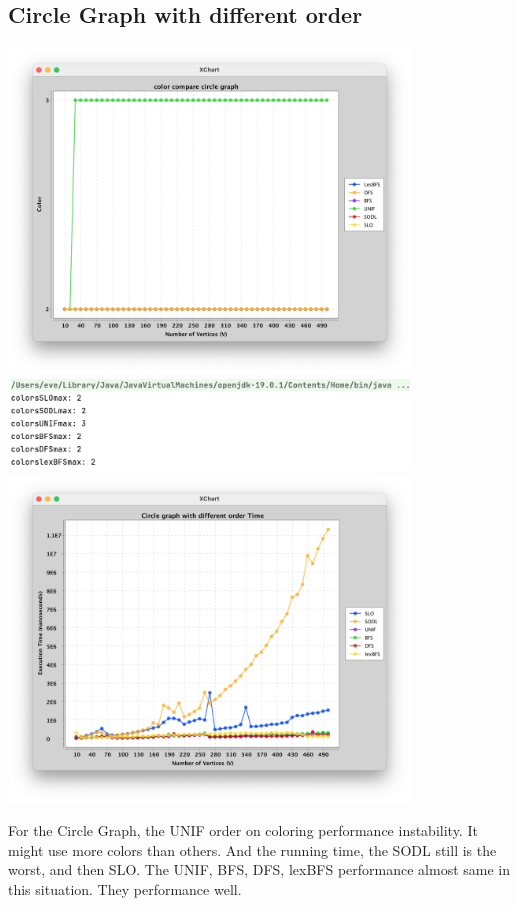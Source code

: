\documentclass{article}
\begin{document}
\subsection{Circle Graph with different order}
    \begin{center}
            \includegraphics[width=0.8\textwidth]{2_3.png}
            \includegraphics[width=0.8\textwidth]{2_4.png}
            \includegraphics[width=0.8\textwidth]{2t2.png}
            
    \end{center}
    For the Circle Graph, the UNIF order on coloring performance instability. It might use more colors than others. And the running time, the SODL still is the worst, and then SLO. The UNIF, BFS, DFS, lexBFS performance almost same in this situation. They performance well. 
\end{document}

